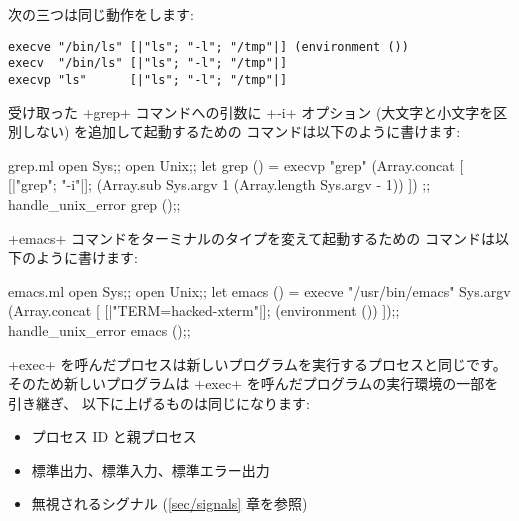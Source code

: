 \begin{example}
次の三つは同じ動作をします:
\begin{lstlisting}
execve "/bin/ls" [|"ls"; "-l"; "/tmp"|] (environment ())
execv  "/bin/ls" [|"ls"; "-l"; "/tmp"|]
execvp "ls"      [|"ls"; "-l"; "/tmp"|]
\end{lstlisting}
\end{example}

\begin{example}
受け取った \ml+grep+ コマンドへの引数に \ml+-i+ オプション (大文字と小文字を区別しない) を追加して起動するための
 コマンドは以下のように書けます:
%
\begin{listingcodefile}{grep.ml}
open Sys;;
open Unix;;
let grep () =
 execvp "grep"
   (Array.concat
      [ [|"grep"; "-i"|];
        (Array.sub Sys.argv 1 (Array.length Sys.argv - 1)) ])
;;
handle_unix_error grep ();;
\end{listingcodefile}
\end{example}

\begin{example}
\ml+emacs+ コマンドをターミナルのタイプを変えて起動するための  コマンドは以下のように書けます:
%
\begin{listingcodefile}{emacs.ml}
open Sys;;
open Unix;;
let emacs () =
 execve "/usr/bin/emacs" Sys.argv
   (Array.concat [ [|"TERM=hacked-xterm"|]; (environment ()) ]);;
handle_unix_error emacs ();;
\end{listingcodefile}
\end{example}

\ml+exec+ を呼んだプロセスは新しいプログラムを実行するプロセスと同じです。
そのため新しいプログラムは \ml+exec+ を呼んだプログラムの実行環境の一部を引き継ぎ、
以下に上げるものは同じになります:
\begin{itemize}
  \item プロセス ID と親プロセス
  \item 標準出力、標準入力、標準エラー出力
  \item 無視されるシグナル (\ref{sec/signals} 章を参照)
\end{itemize}

